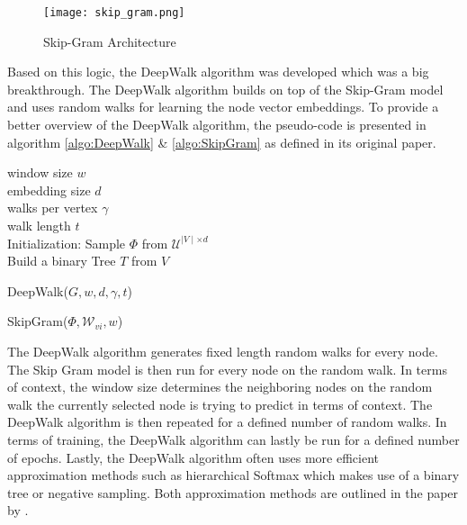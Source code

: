 	\begin{figure}
		\centering
		\texttt{[image: skip\_gram.png]}
		\caption{Skip-Gram Architecture}
		\cite[p. 5]{mikolov2013efficient}
		\label{fig:skip_gram}
	\end{figure}

	\noindent Based on this logic, the DeepWalk algorithm was developed which was a big
	breakthrough. The DeepWalk algorithm builds on top of the Skip-Gram model and 
	uses random walks for learning the node vector embeddings. To provide a 
	better overview of the DeepWalk algorithm, the pseudo-code is presented in 
	algorithm \ref{algo:DeepWalk} \& \ref{algo:SkipGram} as defined in its original paper.
	
	\begin{algorithm}
		\scriptsize
		\SetAlgoLined
		window size $w$\\
		embedding size $d$\\
		walks per vertex $\gamma$\\
		walk length $t$\\
		\nl Initialization: Sample $\Phi$ from $\mathcal{U}^{\mid V
		\mid \times d}$ \\
		\nl Build a binary Tree $T$ from $V$ \\
		\nl {}
		\caption{DeepWalk($G,w,d,\gamma,t$)}
		\label{algo:DeepWalk}
	\end{algorithm}
	
	\begin{algorithm}
		\scriptsize
		\SetAlgoLined
		\nl \ForEach{$v_j \in \mathcal{W}_{vi}$}{
		\nl		\ForEach{$u_k \in \mathcal{W}_{vi}[j-w:j+w]$}{
		\nl			$J(\Phi) = - \log \Pr(u_k \mid \Phi(v_j))$\\
		\nl			$\Phi = \Phi - \alpha * \frac{\partial J}{\partial \Phi}$
				}
			}
		\caption{SkipGram($\Phi,\mathcal{W}_{vi},w$)}
		\label{algo:SkipGram}
	\end{algorithm}
	
	\vspace{5mm}
	
	\noindent The DeepWalk algorithm generates fixed length random walks for
	every node. The Skip Gram model is then run for every node on the random
	walk. In terms of context, the window size determines the neighboring nodes 
	on the random walk the currently selected node is trying to predict in
	terms of context. The DeepWalk algorithm is then repeated for a defined
	number of random walks. In terms of training, the DeepWalk algorithm can
	lastly be run for a defined number of epochs. Lastly, the DeepWalk
	algorithm often uses more efficient approximation methods such as
	hierarchical Softmax which makes use of a binary tree or negative sampling.
	Both approximation methods are outlined in the paper by
	\cite{mikolov2013distributed}. \\


